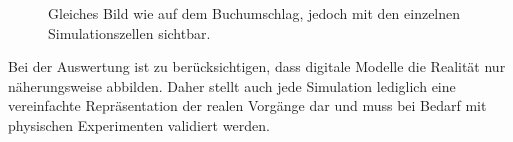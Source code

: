 \begin{figure}
    \centering
{}
    \caption{Gleiches Bild wie auf dem Buchumschlag, jedoch mit den einzelnen Simulationszellen sichtbar.}
    \label{fig:vorschWindWestBlocky}
\end{figure}

Bei der Auswertung ist zu berücksichtigen, dass digitale Modelle die Realität nur näherungsweise abbilden. 
Daher stellt auch jede Simulation lediglich eine vereinfachte Repräsentation der realen Vorgänge dar und muss bei Bedarf mit physischen Experimenten validiert werden.
